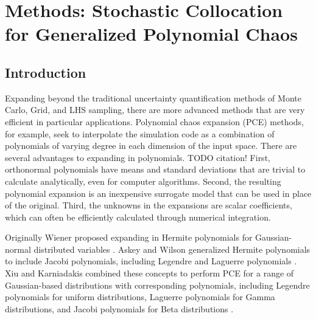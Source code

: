 
\chapter{Methods: Stochastic Collocation for Generalized Polynomial Chaos} %

\label{ch:methods scgpc} %



\section{Introduction}
Expanding beyond the traditional uncertainty quantification methods of Monte Carlo, Grid, and LHS sampling, there are more
advanced methods that are very efficient in particular applications.
Polynomial chaos expansion (PCE) methods, for example, seek to interpolate the simulation code as a combination of
polynomials of varying degree in each dimension of the input space.  There are several advantages to expanding
in polynomials.  TODO citation!  First, orthonormal polynomials have means and standard deviations that are trivial to calculate
analytically, even for computer algorithms.  Second, the resulting polynomial expansion is an
inexpensive surrogate model that can be used in place of the original.  Third, the unknowns in the expansions
are scalar coefficients, which can often be efficiently calculated through numerical integration.

Originally Wiener
proposed expanding in Hermite polynomials for Gaussian-normal distributed variables \cite{wiener}.  Askey and
Wilson generalized Hermite polynomials to include Jacobi polynomials, including Legendre and Laguerre
polynomials \cite{Wiener-Askey}.  Xiu and Karniadakis combined these concepts to perform PCE for a range of Gaussian-based
distributions with corresponding polynomials,
including Legendre polynomials for uniform distributions, Laguerre polynomials for Gamma distributions, and
Jacobi polynomials for Beta distributions \cite{xiu}.

